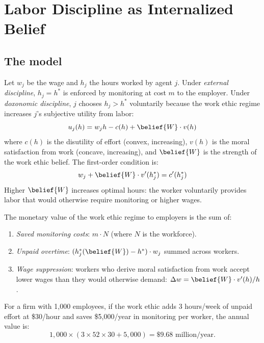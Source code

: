 \section{Labor Discipline as Internalized Belief}
\label{sec:ch26-internalized}

\subsection{The model}

\begin{model}
\label{mod:discipline}
Let $w_j$ be the wage and $h_j$ the hours worked by agent $j$.
Under \emph{external discipline}, $h_j = h^*$ is enforced by monitoring at cost $m$ to the employer.
Under \emph{doxonomic discipline}, $j$ chooses $h_j > h^*$ voluntarily because the work ethic regime increases $j$'s subjective utility from labor:
\[
  u_j(h) = w_j h - c(h) + \belief{W} \cdot v(h)
\]
where $c(h)$ is the disutility of effort (convex, increasing), $v(h)$ is the moral satisfaction from work (concave, increasing), and $\belief{W}$ is the strength of the work ethic belief.
The first-order condition is:
\[
  w_j + \belief{W} \cdot v'(h_j^*) = c'(h_j^*)
\]
Higher $\belief{W}$ increases optimal hours: the worker voluntarily provides labor that would otherwise require monitoring or higher wages.
\end{model}

\begin{proposition}
\label{prop:work-ethic-value}
The monetary value of the work ethic regime to employers is the sum of:
\begin{enumerate}[nosep]
  \item \emph{Saved monitoring costs}: $m \cdot N$ (where $N$ is the workforce).
  \item \emph{Unpaid overtime}: $(h_j^*(\belief{W}) - h^*) \cdot w_j$ summed across workers.
  \item \emph{Wage suppression}: workers who derive moral satisfaction from work accept lower wages than they would otherwise demand: $\Delta w = \belief{W} \cdot v'(h) / h$.
\end{enumerate}
For a firm with 1,000 employees, if the work ethic adds 3 hours/week of unpaid effort at \$30/hour and saves \$5,000/year in monitoring per worker, the annual value is:
\[
  1{,}000 \times (3 \times 52 \times 30 + 5{,}000) = \$9.68 \text{ million/year.}
\]
\end{proposition}

